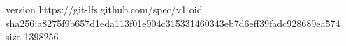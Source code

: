 version https://git-lfs.github.com/spec/v1
oid sha256:a8275f9b657d1eda113f01e904c315331460343eb7d6eff39fadc928689ea574
size 1398256
